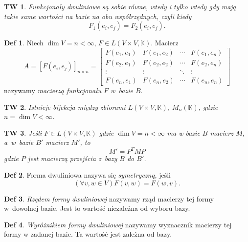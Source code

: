 \documentclass[a4paper, 12pt]{mwart}
\theoremstyle{definition}
\newtheorem{definicja}{Def}[section]
\theoremstyle{plain}
\newtheorem{twierdzenie}{TW}[section]
\theoremstyle{remark}
\begin{document}
\begin{twierdzenie}
	Funkcjonały dwuliniowe są sobie równe, wtedy i tylko wtedy gdy mają takie same wartości na bazie na obu współrzędnych, czyli kiedy
	\begin{equation}
		F_1(e_i, e_j) = F_2(e_i, e_j).
	\end{equation}
\end{twierdzenie}
\begin{definicja}
	Niech $\dim V = n < \infty$, $F\in L(V\times V, \mathbb{K})$. Macierz
	\begin{equation}
		A = {\left[F(e_i, e_j)\right]}_{n \times n} = 
		\begin{bmatrix}
			F(e_1, e_1) & F(e_1, e_2) & \cdots & F(e_1, e_n) \\
			F(e_2, e_1) & F(e_2, e_2) & \cdots & F(e_2, e_n) \\
			\vdots & \vdots & \ddots & \vdots \\
			F(e_n, e_1) & F(e_n, e_2) & \cdots & F(e_n, e_n)
		\end{bmatrix}
	\end{equation}
	nazywamy \emph{macierzą funkcjonału $F$ w~bazie $B$}.
\end{definicja}
\begin{twierdzenie}
	Istnieje bijekcja między zbiorami $L(V\times V, \mathbb{K})$, $M_n(\mathbb{K})$, gdzie $n = \dim V < \infty$. %
\end{twierdzenie}
\begin{twierdzenie}
	Jeśli $F \in L(V\times V, \mathbb{K})$ gdzie $\dim V = n < \infty$ ma w bazie $B$ macierz $M$, a~w~bazie $B'$ macierz $M'$, to
	\begin{equation}
		M' = P^TMP
	\end{equation}
	gdzie $P$ jest macierzą przejścia z~bazy $B$ do $B'$.
\end{twierdzenie}
\begin{definicja}
	Forma dwuliniowa nazywa się \emph{symetryczną}, jeśli
	\begin{equation}
		\left(\forall v, w\in V\right) F(v, w) = F(w, v).
	\end{equation}
\end{definicja}
\begin{definicja}
	\emph{Rzędem formy dwuliniowej} nazywamy rząd macierzy tej formy w~dowolnej bazie. Jest to wartość niezależna od wyboru bazy.
\end{definicja}
\begin{definicja}
	\emph{Wyróżnikiem formy dwuliniowej} nazywamy wyznacznik macierzy tej formy w zadanej bazie. Ta wartość jest zależna od bazy.
\end{definicja}
\end{document}
